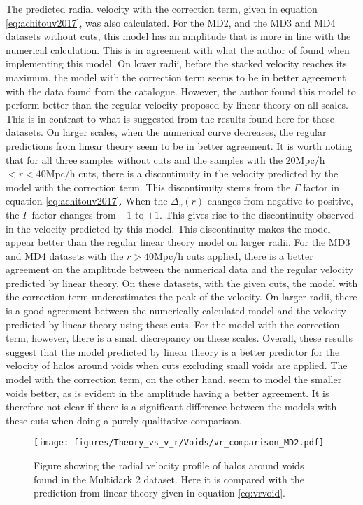 The predicted radial velocity with the correction term, given in equation \ref{eq:achitouv2017}, was also calculated. For the MD2, and the MD3 and MD4 datasets without cuts, this model has an amplitude that is more in line with the numerical calculation. This is in agreement with what the author of \cite{Achitouv_streaming} found when implementing this model. On lower radii, before the stacked velocity reaches its maximum, the model with the correction term seems to be in better agreement with the data found from the catalogue. However, the author found this model to perform better than the regular velocity proposed by linear theory on all scales. This is in contrast to what is suggested from the results found here for these datasets. On larger scales, when the numerical curve decreases, the regular predictions from linear theory seem to be in better agreement. It is worth noting that for all three samples without cuts and the samples with the $20$Mpc/h$<r<40$Mpc/h cuts, there is a discontinuity in the velocity predicted by the model with the correction term. This discontinuity stems from the $\Gamma$ factor in equation \ref{eq:achitouv2017}. When the $\Delta_v(r)$ changes from negative to positive, the $\Gamma$ factor changes from $-1$ to $+1$. This gives rise to the discontinuity observed in the velocity predicted by this model. This discontinuity makes the model appear better than the regular linear theory model on larger radii. For the MD3 and MD4 datasets with the $r>40$Mpc/h cuts applied, there is a better agreement on the amplitude between the numerical data and the regular velocity predicted by linear theory. On these datasets, with the given cuts, the model with the correction term underestimates the peak of the velocity. On larger radii, there is a good agreement between the numerically calculated model and the velocity predicted by linear theory using these cuts. For the model with the correction term, however, there is a small discrepancy on these scales. Overall, these results suggest that the model predicted by linear theory is a better predictor for the velocity of halos around voids when cuts excluding small voids are applied. The model with the correction term, on the other hand, seem to model the smaller voids better, as is evident in the amplitude having a better agreement. It is therefore not clear if there is a significant difference between the models with these cuts when doing a purely qualitative comparison.
\begin{figure}[H]
    \texttt{[image: figures/Theory\_vs\_v\_r/Voids/vr\_comparison\_MD2.pdf]}
    \caption{Figure showing the radial velocity profile of halos around voids found in the Multidark 2 dataset. Here it is compared with the prediction from linear theory given in equation \ref{eq:vrvoid}.}
    \label{fig:vrMD2}
\end{figure}

